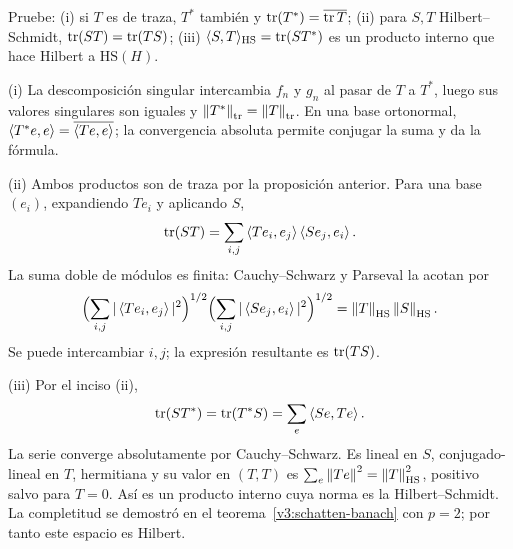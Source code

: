\begin{ejercicio}\label{ej:v3-l12-5}
Pruebe: (i) si $T$ es de traza, $T^*$ también y $\operatorname{tr}(T^*)=\overline{\operatorname{tr} T}$; (ii) para $S,T$ Hilbert--Schmidt, $\operatorname{tr}(ST)=\operatorname{tr}(TS)$; (iii) $\langle S,T\rangle_{\mathrm{HS}}=\operatorname{tr}(ST^*)$ es un producto interno que hace Hilbert a $\mathrm{HS}(H)$.
\end{ejercicio}
\begin{solucion}
(i) La descomposición singular intercambia $f_n$ y $g_n$ al pasar de $T$ a $T^*$, luego sus valores singulares son iguales y $\left\lVert T^*\right\rVert_{\mathrm{tr}}=\left\lVert T\right\rVert_{\mathrm{tr}}$. En una base ortonormal,
$\left\langle T^*e,e\right\rangle=\overline{\left\langle Te,e\right\rangle}$; la convergencia absoluta permite conjugar la suma y da la fórmula.

(ii) Ambos productos son de traza por la proposición anterior. Para una base $(e_i)$, expandiendo $Te_i$ y aplicando $S$,
\[\operatorname{tr}(ST)=\sum_{i,j}\left\langle Te_i,e_j\right\rangle\left\langle Se_j,e_i\right\rangle.
\]
La suma doble de módulos es finita: Cauchy--Schwarz y Parseval la acotan por
\[\Bigl(\sum_{i,j}|\left\langle Te_i,e_j\right\rangle|^2\Bigr)^{1/2}
\Bigl(\sum_{i,j}|\left\langle Se_j,e_i\right\rangle|^2\Bigr)^{1/2}
=\left\lVert T\right\rVert_{\mathrm{HS}}\left\lVert S\right\rVert_{\mathrm{HS}}.
\]
Se puede intercambiar $i,j$; la expresión resultante es $\operatorname{tr}(TS)$.

(iii) Por el inciso (ii),
\[\operatorname{tr}(ST^*)=\operatorname{tr}(T^*S)=\sum_e\left\langle Se,Te\right\rangle.
\]
La serie converge absolutamente por Cauchy--Schwarz. Es lineal en $S$, conjugado-lineal en $T$, hermitiana y su valor en $(T,T)$ es $\sum_e\left\lVert Te\right\rVert^2=\left\lVert T\right\rVert_{\mathrm{HS}}^2$, positivo salvo para $T=0$. Así es un producto interno cuya norma es la Hilbert--Schmidt. La completitud se demostró en el teorema~\ref{v3:schatten-banach} con $p=2$; por tanto este espacio es Hilbert.
\end{solucion}

